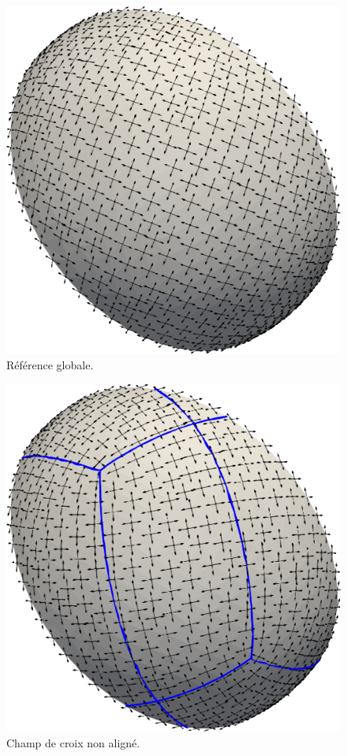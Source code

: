 \begin{figure}[!h]
\centering
\includegraphics[scale=0.4]{images/frame.png}
\caption{Référence globale.}
\label{globalframe}
\end{figure}

\begin{figure}[!h]
\centering
\includegraphics[scale=0.38]{images/nonalign.png}
\caption{Champ de croix non aligné.}
\label{nonalign}
\end{figure}


